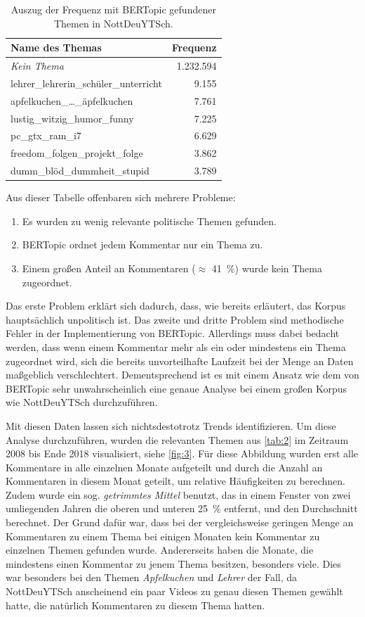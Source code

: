 \begin{table}
    \centering
    \begin{tabular}[c]{l r}
        \hline
        Name des Themas & Frequenz \\
        \hline \hline
        \emph{Kein Thema} & 1.232.594 \\
        lehrer\_lehrerin\_schüler\_unterricht & 9.155 \\
        apfelkuchen\_\dots\_äpfelkuchen & 7.761 \\
        lustig\_witzig\_humor\_funny & 7.225 \\
        pc\_gtx\_ram\_i7 & 6.629 \\
        freedom\_folgen\_projekt\_folge & 3.862 \\
        dumm\_blöd\_dummheit\_stupid & 3.789 \\
        \hline
    \end{tabular}
    \caption{Auszug der Frequenz mit BERTopic gefundener Themen in NottDeuYTSch.}
    \label{tab:2}
\end{table}

Aus dieser Tabelle offenbaren sich mehrere Probleme:
\begin{enumerate}
    \item Es wurden zu wenig relevante politische Themen gefunden.
    \item BERTopic ordnet jedem Kommentar nur ein Thema zu.
    \item Einem großen Anteil an Kommentaren (\(\approx\) 41~\%) wurde kein Thema zugeordnet.
\end{enumerate}
Das erste Problem erklärt sich dadurch, dass, wie bereits erläutert, das Korpus hauptsächlich unpolitisch ist.
Das zweite und dritte Problem sind methodische Fehler in der Implementierung von BERTopic.
Allerdings muss dabei bedacht werden, dass wenn einem Kommentar mehr als ein oder mindestens ein Thema zugeordnet wird, sich die bereits unvorteilhafte Laufzeit bei der Menge an Daten maßgeblich verschlechtert.
Dementsprechend ist es mit einem Ansatz wie dem von BERTopic sehr unwahrscheinlich eine genaue Analyse bei einem großen Korpus wie NottDeuYTSch durchzuführen.

Mit diesen Daten lassen sich nichtsdestotrotz Trends identifizieren.
Um diese Analyse durchzuführen, wurden die relevanten Themen aus \autoref{tab:2} im Zeitraum 2008 bis Ende 2018 visualisiert, siehe \autoref{fig:3}.
Für diese Abbildung wurden erst alle Kommentare in alle einzelnen Monate aufgeteilt und durch die Anzahl an Kommentaren in diesem Monat geteilt, um relative Häufigkeiten zu berechnen.
Zudem wurde ein sog. \emph{getrimmtes Mittel} benutzt, das in einem Fenster von zwei umliegenden Jahren die oberen und unteren 25~\% entfernt, und den Durchschnitt berechnet.
Der Grund dafür war, dass bei der vergleichsweise geringen Menge an Kommentaren zu einem Thema bei einigen Monaten kein Kommentar zu einzelnen Themen gefunden wurde.
Andererseits haben die Monate, die mindestens einen Kommentar zu jenem Thema besitzen, besonders viele.
Dies war besonders bei den Themen \emph{Apfelkuchen} und \emph{Lehrer} der Fall, da NottDeuYTSch anscheinend ein paar Videos zu genau diesen Themen gewählt hatte, die natürlich Kommentaren zu diesem Thema hatten.

